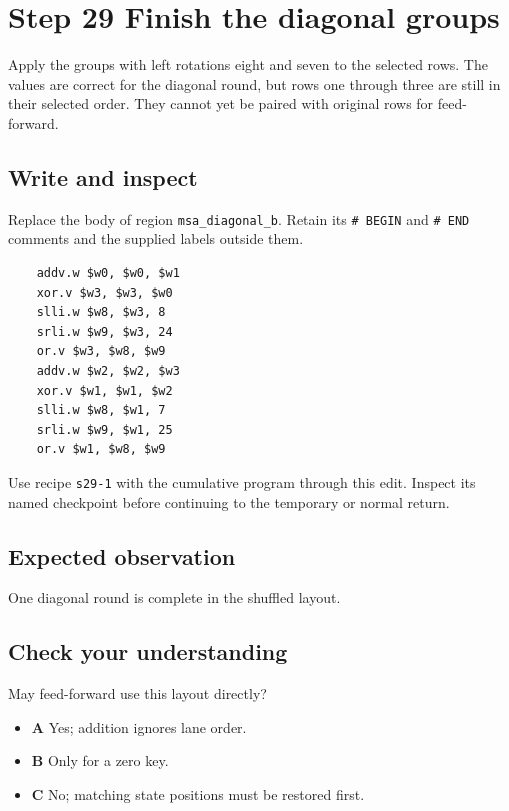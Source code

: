 \section{Step 29 Finish the diagonal groups}\label{chacha-s29}

Apply the groups with left rotations eight and seven to the selected rows. The values are correct for the diagonal round, but rows one through three are still in their selected order. They cannot yet be paired with original rows for feed-forward.

\subsection{Write and inspect}
Replace the body of region \texttt{msa\_diagonal\_b}. Retain its \texttt{\# BEGIN} and \texttt{\# END} comments and the supplied labels outside them.

\begin{verbatim}
    addv.w $w0, $w0, $w1
    xor.v $w3, $w3, $w0
    slli.w $w8, $w3, 8
    srli.w $w9, $w3, 24
    or.v $w3, $w8, $w9
    addv.w $w2, $w2, $w3
    xor.v $w1, $w1, $w2
    slli.w $w8, $w1, 7
    srli.w $w9, $w1, 25
    or.v $w1, $w8, $w9
\end{verbatim}

Use recipe \texttt{s29-1} with the cumulative program through this edit. Inspect its named checkpoint before continuing to the temporary or normal return.

\subsection{Expected observation}
One diagonal round is complete in the shuffled layout.

\subsection{Check your understanding}
May feed-forward use this layout directly?

\begin{itemize}
\item \textbf{A} Yes; addition ignores lane order.
\item \textbf{B} Only for a zero key.
\item \textbf{C} No; matching state positions must be restored first.
\end{itemize}
